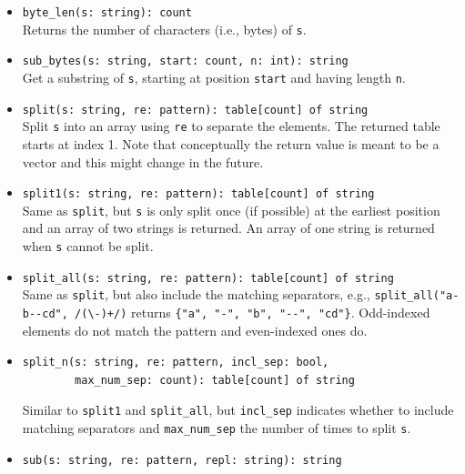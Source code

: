 \documentclass[10pt,landscape]{article}
\begin{document}
\begin{multicols*}{2}
\begin{itemize}
  \item \verb|byte_len(s: string): count|\\
    Returns the number of characters (i.e., bytes) of \texttt{s}.
  \item \verb|sub_bytes(s: string, start: count, n: int): string|\\
    Get a substring of \texttt{s}, starting at position \texttt{start} and
    having length \texttt{n}.
  \item \verb|split(s: string, re: pattern): table[count] of string|\\
    Split \texttt{s} into an array using \texttt{re} to separate the elements.
    The returned table starts at index 1. Note that conceptually the return
    value is meant to be a vector and this might change in the future.
  \item \verb|split1(s: string, re: pattern): table[count] of string|\\
    Same as \texttt{split}, but \texttt{s} is only split once (if possible) at
    the earliest position and an array of two strings is returned. An array of
    one string is returned when \texttt{s} cannot be split.
  \item \verb|split_all(s: string, re: pattern): table[count] of string|\\
    Same as \texttt{split}, but also include the matching separators, e.g.,
    \verb|split_all("a-b--cd", /(\-)+/)| returns
    \verb|{"a", "-", "b", "--", "cd"}|. Odd-indexed elements do not match the
    pattern and even-indexed ones do.
  \item
\begin{verbatim}
split_n(s: string, re: pattern, incl_sep: bool,
        max_num_sep: count): table[count] of string
\end{verbatim}
    Similar to \verb|split1| and \verb|split_all|, but \verb|incl_sep|
    indicates whether to include matching separators and \verb|max_num_sep| the
    number of times to split \texttt{s}.
  \item \verb|sub(s: string, re: pattern, repl: string): string|\\

\end{itemize}
\end{multicols*}
\end{document}
